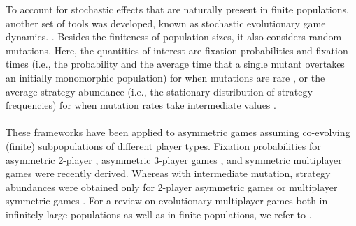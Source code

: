 \documentclass[11pt]{article}
\theoremstyle{plainCl1}
\theoremstyle{plainCl2}
\begin{document}
\noindent To account for stochastic effects that are naturally present in finite populations, another set of tools was developed, known as stochastic evolutionary game dynamics.  \cite{Nowak:Nature:2004, Traulsen:bookchapter:2009}. Besides the finiteness of population sizes, it also considers random mutations. Here, the quantities of interest are fixation probabilities and fixation times (i.e., the probability and the average time that a single mutant overtakes an initially monomorphic population) for when mutations are rare \cite{Fudenberg:TPB:2006}, or the average strategy abundance (i.e., the stationary distribution of strategy frequencies) for when mutation rates take intermediate values \cite{antal:JTB:2009a, antal:JTB:2009b}. 
\\ \\
\noindent 
These frameworks have been applied to asymmetric games assuming co-evolving (finite) subpopulations of different player types. Fixation probabilities for asymmetric 2-player \cite{Sekiguchi:DGA:2017}, asymmetric 3-player games \cite{Sekiguchi:DGAA:2022}, and symmetric multiplayer games \cite{Kurokawa:PRSB:2009, gokhale:PNAS:2010} were recently derived. Whereas with intermediate mutation, strategy abundances were obtained only for 2-player asymmetric games \cite{Ohtsuki:JTB:2010, Sekiguchi:PA:2013} or multiplayer symmetric games \cite{gokhale:JTB:2011, Wu:Games:2013, Kroumi:JMB:2022}. For a review on evolutionary multiplayer games both in infinitely large populations as well as in finite populations, we refer to \cite{Gokhale:DGAA:2014}.\\ 

\end{document}
